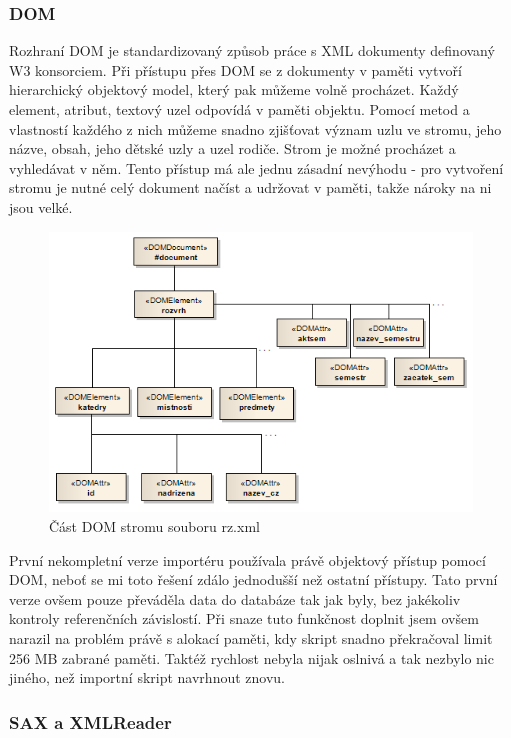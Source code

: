 \documentclass[11pt,twoside,a4paper]{book}
\begin{document}
\subsubsection{DOM}
Rozhraní DOM je standardizovaný způsob práce s XML dokumenty definovaný W3 konsorciem. Při přístupu přes DOM se z dokumenty v paměti vytvoří hierarchický objektový model, který pak můžeme volně procházet. Každý element, atribut, textový uzel odpovídá v paměti objektu. Pomocí metod a vlastností každého z nich můžeme snadno zjišťovat význam uzlu ve stromu, jeho názve, obsah, jeho dětské uzly a uzel rodiče. Strom je možné procházet a vyhledávat v něm. Tento přístup má ale jednu zásadní nevýhodu - pro vytvoření stromu je nutné celý dokument načíst a udržovat v paměti, takže nároky na ni jsou velké.
\begin{figure}[h]
\begin{center}
\includegraphics[width=12cm]{figures/dom.png}
\caption{Část DOM stromu souboru rz.xml}
\label{fig:dom}
\end{center}
\end{figure}

První nekompletní verze importéru používala právě objektový přístup pomocí DOM, neboť se mi toto řešení zdálo jednodušší než ostatní přístupy. Tato první verze ovšem pouze převáděla data do databáze tak jak byly, bez jakékoliv kontroly referenčních závislostí. Při snaze tuto funkčnost doplnit jsem ovšem narazil na problém právě s alokací paměti, kdy skript snadno překračoval limit 256 MB zabrané paměti. Taktéž rychlost nebyla nijak oslnivá a tak nezbylo nic jiného, než importní skript navrhnout znovu.

\subsubsection{SAX a XMLReader}
\end{document}
